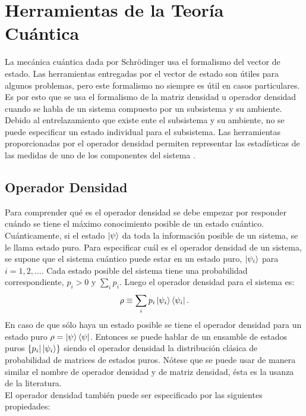 \section{Herramientas de la Teoría Cuántica}
La mecánica cuántica dada por Schrödinger usa el formalismo del vector de estado. Las herramientas entregadas por el vector de estado son útiles para algunos problemas, pero este formalismo no siempre es útil en casos particulares. Es por esto que se usa el formalismo de la matriz densidad u operador densidad cuando se habla de un sistema compuesto por un subsistema y su ambiente. Debido al entrelazamiento que existe ente el subsistema y su ambiente, no se puede especificar un estado individual para el subsistema. Las herramientas proporcionadas por el operador densidad permiten representar las estadísticas de las medidas de uno de los componentes del sistema \cite{Decoherence}.
\\

\subsection{Operador Densidad}
Para comprender qué es el operador densidad se debe empezar por responder cuándo se tiene el máximo conocimiento posible de un estado cuántico. Cuánticamente, si el estado $\ket{\psi}$ da toda la información posible de un sistema, se le llama estado puro. Para especificar cuál es el operador densidad de un sistema, se supone que el sistema cuántico puede estar en un estado puro, $\ket{\psi_{i}}$ para $i=1,2,...$. Cada estado posible del sistema tiene una probabilidad correspondiente, $p_{i}>0$ y $\sum_{i} p_{i}$. Luego el operador densidad para el sistema es:
\begin{equation}
\rho \equiv \sum_{i} p_{i} \ket{\psi_{i}}\bra{\psi_{i}}.
\end{equation}
En caso de que sólo haya un estado posible se tiene el operador densidad para un estado puro $\rho= \ket{\psi}\bra{\psi}$. Entonces se puede hablar de un ensamble de estados puros $ \{ p_{i} | \ket{\psi_{i}} \} $  siendo el operador densidad la distribución clásica de probabilidad de matrices de estados puros. Nótese que se puede usar de manera similar el nombre de operador densidad y de matriz densidad, ésta es la usanza de la literatura. 
\\
El operador densidad también puede ser especificado por las siguientes propiedades: 

